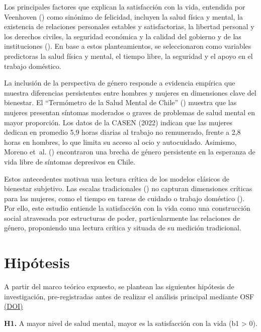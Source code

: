 \documentclass[
  spanish,
  a4paper,
  oneside]{scrbook}
\begin{document}
Los principales factores que explican la satisfacción con la vida,
entendida por Veenhoven ()
como sinónimo de felicidad, incluyen la salud física y mental, la
existencia de relaciones personales estables y satisfactorias, la
libertad personal y los derechos civiles, la seguridad económica y la
calidad del gobierno y de las instituciones
(). En base a estos
planteamientos, se seleccionaron como variables predictoras la salud
física y mental, el tiempo libre, la seguridad y el apoyo en el trabajo
doméstico.

La inclusión de la perspectiva de género responde a evidencia empírica
que muestra diferencias persistentes entre hombres y mujeres en
dimensiones clave del bienestar. El ``Termómetro de la Salud Mental de
Chile'' () muestra que las
mujeres presentan síntomas moderados o graves de problemas de salud
mental en mayor proporción. Los datos de la CASEN (2022) indican que las
mujeres dedican en promedio 5,9 horas diarias al trabajo no remunerado,
frente a 2,8 horas en hombres, lo que limita su acceso al ocio y
autocuidado. Asimismo, Moreno et~al. ()
encontraron una brecha de género persistente en la esperanza de vida
libre de síntomas depresivos en Chile.

Estos antecedentes motivan una lectura crítica de los modelos clásicos
de bienestar subjetivo. Las escalas tradicionales
() no capturan dimensiones
críticas para las mujeres, como el tiempo en tareas de cuidado o trabajo
doméstico (). Por
ello, este estudio entiende la satisfacción con la vida como una
construcción social atravesada por estructuras de poder, particularmente
las relaciones de género, proponiendo una lectura crítica y situada de
su medición tradicional.


\chapter{Hipótesis}\label{hipuxf3tesis}

A partir del marco teórico expuesto, se plantean las siguientes
hipótesis de investigación, pre-registradas antes de realizar el
análisis principal mediante OSF
\href{https://osf.io/x4zna/overview}{(DOI)}

\textbf{H1.} A mayor nivel de salud mental, mayor es la satisfacción con
la vida (b1 \textgreater{} 0).
\end{document}
